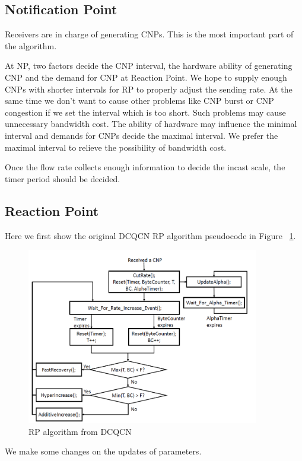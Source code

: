 \documentclass[12pt,a4paper]{article}
\begin{document}
\subsection{Notification Point}

Receivers are in charge of generating CNPs.
This is the most important part of the algorithm.

At NP, two factors decide the CNP interval, the hardware ability of generating CNP and the demand for CNP at Reaction Point.
We hope to supply enough CNPs with shorter intervals for RP to properly adjust the sending rate.
At the same time we don't want to cause other problems like CNP burst or CNP congestion if we set the interval which is too short.
Such problems may cause unnecessary bandwidth cost.
The ability of hardware may influence the minimal interval and demands for CNPs decide the maximal interval.
We prefer the maximal interval to relieve the possibility of bandwidth cost.

Once the flow rate collects enough information to decide the incast scale, the timer period should be decided.

\subsection{Reaction Point}

Here we first show the original DCQCN RP algorithm pseudocode in Figure ~\ref{fig:RPalg}.
\begin{figure}[ht]
	\begin{center}
		\includegraphics[width=4in]{RPalg}
		\caption{RP algorithm from DCQCN}
		\label{fig:RPalg}
	\end{center}
\end{figure}

We make some changes on the updates of parameters.
\end{document}
